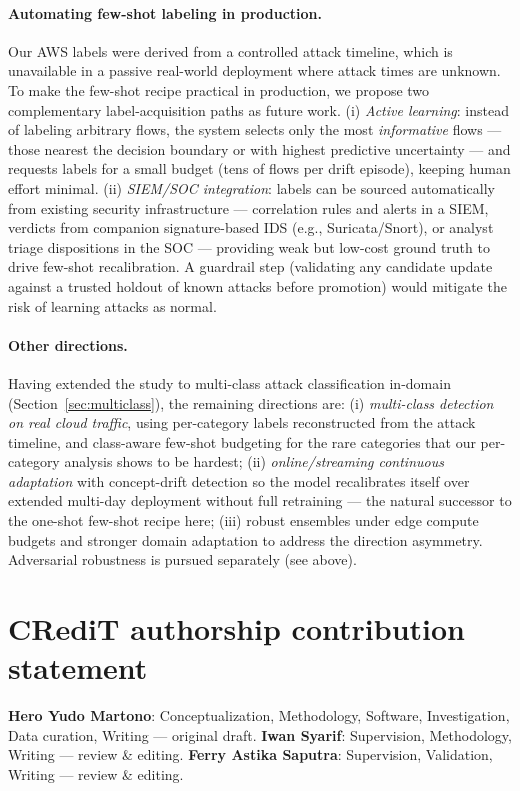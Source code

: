 \documentclass[preprint,12pt,authoryear]{elsarticle}
\begin{document}
\paragraph{Automating few-shot labeling in production.} Our AWS labels were derived
from a controlled attack timeline, which is unavailable in a passive real-world
deployment where attack times are unknown. To make the few-shot recipe practical
in production, we propose two complementary label-acquisition paths as future work.
(i) \emph{Active learning}: instead of labeling arbitrary flows, the system selects
only the most \emph{informative} flows --- those nearest the decision boundary or
with highest predictive uncertainty --- and requests labels for a small budget
(tens of flows per drift episode), keeping human effort minimal. (ii)
\emph{SIEM/SOC integration}: labels can be sourced automatically from existing
security infrastructure --- correlation rules and alerts in a SIEM, verdicts from
companion signature-based IDS (e.g., Suricata/Snort), or analyst triage
dispositions in the SOC --- providing weak but low-cost ground truth to drive
few-shot recalibration. A guardrail step (validating any candidate update against a
trusted holdout of known attacks before promotion) would mitigate the risk of
learning attacks as normal.

\paragraph{Other directions.} Having extended the study to multi-class attack
classification in-domain (Section~\ref{sec:multiclass}), the remaining directions
are: (i) \emph{multi-class detection on real cloud traffic}, using per-category
labels reconstructed from the attack timeline, and class-aware few-shot budgeting
for the rare categories that our per-category analysis shows to be hardest;
(ii) \emph{online/streaming continuous adaptation} with concept-drift detection so
the model recalibrates itself over extended multi-day deployment without full
retraining --- the natural successor to the one-shot few-shot recipe here;
(iii) robust ensembles under edge compute budgets and stronger domain adaptation to
address the direction asymmetry. Adversarial robustness is pursued separately (see
above).

\section*{CRediT authorship contribution statement}
\textbf{Hero Yudo Martono}: Conceptualization, Methodology, Software,
Investigation, Data curation, Writing --- original draft. \textbf{Iwan Syarif}:
Supervision, Methodology, Writing --- review \& editing. \textbf{Ferry Astika
Saputra}: Supervision, Validation, Writing --- review \& editing.
\end{document}
